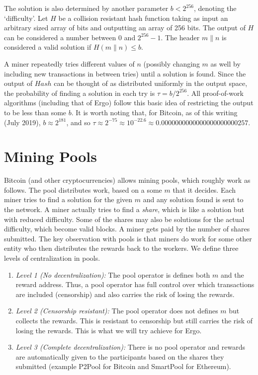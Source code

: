 \documentclass[runningheads]{llncs}
\begin{document}
The solution is also determined by another parameter $b < 2^{256}$, denoting the `difficulty'. Let $H$ be a collision resistant hash function taking as input an arbitrary sized array of bits and outputting an array of 256 bits. The output of $H$ can be considered a number between 0 and $2^{256}-1$. The header $m\|n$ is considered a valid solution if $H(m\|n) \leq b$. 

A miner repeatedly tries different values of $n$ (possibly changing $m$ as well by including new transactions in between tries) until a solution is found. Since the output of $Hash$ can be thought of as distributed uniformly in the output space, the probability of finding a solution in each try is $\tau = b/2^{256}$. All proof-of-work algorithms (including that of Ergo) follow this basic idea of restricting the output to be less than some $b$. It is worth noting that, for Bitcoin, as of this writing (July 2019), $b\approx 2^{181}$, and so $\tau \approx 2^{-75}\approx 10^{-22.6}\approx 0.0000000000000000000000257$.

\section{Mining Pools}

Bitcoin (and other cryptocurrencies) allows mining pools, which roughly work as follows. The pool distributes work, based on a some $m$ that it decides. Each miner tries to find a solution for the given $m$ and any solution found is sent to the network. 
A miner actually tries to find a {\em share}, which is like a solution but with reduced difficulty. Some of the shares may also be solutions for the actual difficulty, which become valid blocks. A miner gets paid by the number of shares submitted.
The key observation with pools is that miners do work for some other entity who then distributes the rewards back to the workers.
We define three levels of centralization in pools. 

\begin{enumerate}
	\item {\em Level 1 (No decentralization):} The pool operator is defines both $m$ and the reward address. Thus, a pool operator has full control over which transactions are included (censorship) and also carries the risk of losing the rewards.
	\item {\em Level 2 (Censorship resistant):} The pool operator does not defines $m$ but collects the rewards. This is resistant to censorship but still carries the risk of losing the rewards. This is what we will try achieve for Ergo. 
	\item {\em Level 3 (Complete decentralization):} There is no pool operator and rewards are automatically given to the participants based on the shares they submitted (example P2Pool for Bitcoin and SmartPool for Ethereum).
\end{enumerate}
\end{document}
